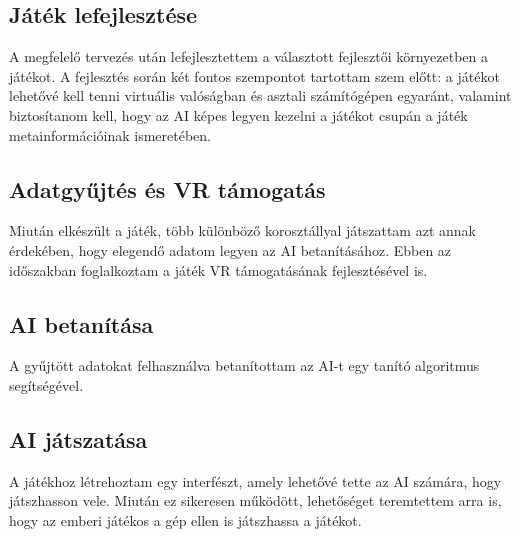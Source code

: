 \subsection{Játék lefejlesztése}
A megfelelő tervezés után lefejlesztettem a választott fejlesztői környezetben a játékot. A fejlesztés során két fontos szempontot tartottam szem előtt: a játékot lehetővé kell tenni virtuális valóságban és asztali számítógépen egyaránt, valamint biztosítanom kell, hogy az AI képes legyen kezelni a játékot csupán a játék metainformációinak ismeretében.

\subsection{Adatgyűjtés és VR támogatás}
Miután elkészült a játék, több különböző korosztállyal játszattam azt annak érdekében, hogy elegendő adatom legyen az AI betanításához. Ebben az időszakban foglalkoztam a játék VR támogatásának fejlesztésével is.

\subsection{AI betanítása}
A gyűjtött adatokat felhasználva betanítottam az AI-t egy tanító algoritmus segítségével.

\subsection{AI játszatása}
A játékhoz létrehoztam egy interfészt, amely lehetővé tette az AI számára, hogy játszhasson vele. Miután ez sikeresen működött, lehetőséget teremtettem arra is, hogy az emberi játékos a gép ellen is játszhassa a játékot.